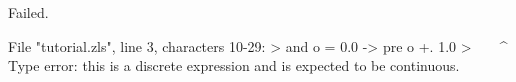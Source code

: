 \runverbatimfalse
{}
\begin{RunVerbatimMsg}
Failed.
\end{RunVerbatimMsg}
\begin{RunVerbatimErr}
File "tutorial.zls", line 3, characters 10-29:
>  and o = 0.0 -> pre o +. 1.0
>          ^^^^^^^^^^^^^^^^^^^
Type error: this is a discrete expression and is expected to be continuous.
\end{RunVerbatimErr}
